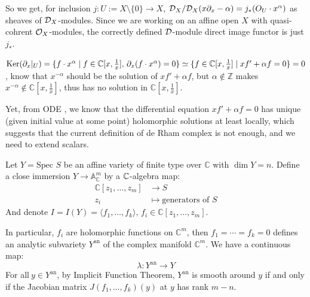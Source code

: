 \begin{remark}
    So we get, for inclusion $j: U:=X\setminus \{0\} \to X$, $\mathcal{D}_X/\mathcal{D}_X(x\partial_x-\alpha) = j_*(O_U\cdot x^\alpha)$ as sheaves of $\mathcal{D}_X$-modules. Since we are working on an affine open $X$ with quasi-cohrent $\mathcal{O}_X$-modules, the correctly defined $\mathcal{D}$-module direct image functor \cite[$Rf_*$ in Sec.~1.5.]{hotta2008d} is just $j_*$.
\end{remark}

\mbox{}

$\text{Ker}(\partial_x|_U) = \{f \cdot x^{\alpha} \mid f\in \mathbb{C}[x,\frac{1}{x}],\,\partial_x(f \cdot x^{\alpha}) = 0\}\simeq \{f \in \mathbb{C}[x, \frac{1}{x}] \mid xf' + \alpha f= 0\} = 0$, know that $x^{-\alpha}$ should be the solution of $xf'+\alpha f$, but $\alpha\not\in \mathbb{Z}$ makes $x^{-\alpha}\not\in \mathbb{C}\left[ x, \frac{1}{x} \right]$, thus has no solution in $\mathbb{C}[x, \frac{1}{x}]$.

Yet, from ODE \cite[Chap.~XIX, n\textsuperscript{o}~384]{Goursat1933CoursAnalyseT2},
we know that the differential equation $xf'+\alpha f=0$ has unique (given initial value at some point) holomorphic solutions at least locally, which suggests that the current definition of de Rham complex is not enough, and we need to extend scalars.

\quad

Let $Y = \text{Spec } S$ be an affine variety of finite type over $\mathbb{C}$ with $\dim Y = n$. Define a close immersion $Y \longrightarrow \mathbb{A}^{m}_{\mathbb{C}}$ by a $\mathbb{C}$-algebra map:
\begin{align*}
    \mathbb{C}[z_1, \ldots, z_m] & \longrightarrow S                   \\
    z_i                          & \longmapsto \text{generators of } S
\end{align*}
And denote $I = I(Y) = \langle f_1, \ldots, f_k \rangle, \, f_i \in \mathbb{C}[z_1, \ldots, z_m]$.

In particular, $f_i$ are holomorphic functions on $\mathbb{C}^m$, then $f_1 = \cdots = f_k = 0$ defines an analytic subvariety $Y^{\mathrm{an}}$ of the complex manifold $\mathbb{C}^m$. We have a continuous map:
$$ \lambda: Y^{\mathrm{an}} \longrightarrow Y $$For all$\ y \in Y^{\mathrm{an}}$, by Implicit Function Theorem, $Y^{\mathrm{an}}$ is smooth around $y$ if and only if the Jacobian matrix $J(f_1, \ldots, f_k)(y)$ at $y$ has rank $m-n$.

